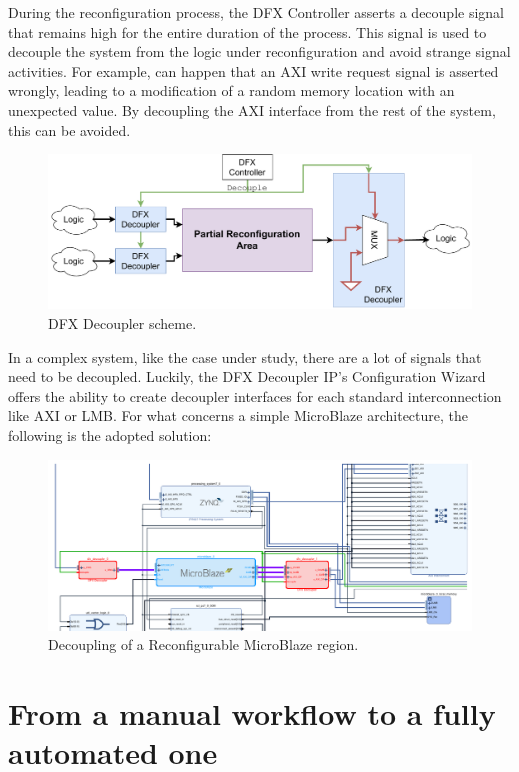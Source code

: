During the reconfiguration process, the DFX Controller asserts a decouple signal that remains high for the entire duration of the process. This signal is used to decouple the system from the logic under reconfiguration and avoid strange signal activities. For example, can happen that an AXI write request signal is asserted wrongly, leading to a modification of a random memory location with an unexpected value. By decoupling the AXI interface from the rest of the system, this can be avoided. 

\begin{figure}[H]
\centering
\includegraphics[width=0.95\linewidth]{images/chapter4/dfx_dec.pdf}
\caption{DFX Decoupler scheme.}
\end{figure}

In a complex system, like the case under study, there are a lot of signals that need to be decoupled. Luckily, the DFX Decoupler IP's Configuration Wizard offers the ability to create decoupler interfaces for each standard interconnection like AXI or LMB. For what concerns a simple MicroBlaze architecture, the following is the adopted solution:

\begin{figure}[H]
\centering
\includegraphics[width=0.95\linewidth]{images/chapter4/dec_mb-cropped.pdf}
\caption{Decoupling of a Reconfigurable MicroBlaze region.}
\end{figure}

\section{From a manual workflow to a fully automated one}

